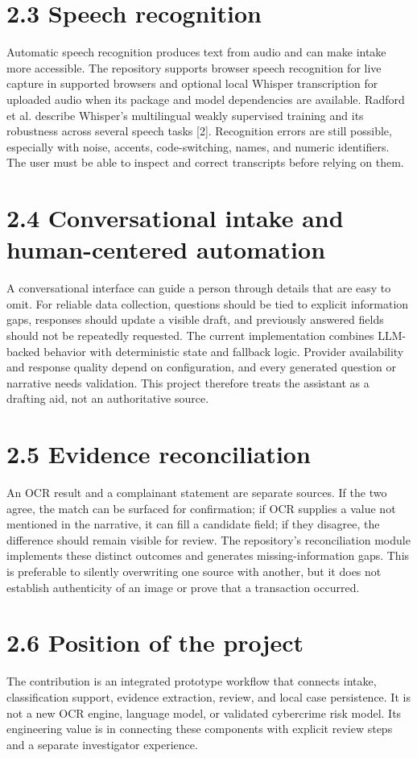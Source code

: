 \documentclass[12pt,a4paper,oneside]{report}
\begin{document}
\section{2.3 Speech recognition}
Automatic speech recognition produces text from audio and can make intake more accessible. The repository supports browser speech recognition for live capture in supported browsers and optional local Whisper transcription for uploaded audio when its package and model dependencies are available. Radford et al. describe Whisper's multilingual weakly supervised training and its robustness across several speech tasks [2]. Recognition errors are still possible, especially with noise, accents, code-switching, names, and numeric identifiers. The user must be able to inspect and correct transcripts before relying on them.

\section{2.4 Conversational intake and human-centered automation}
A conversational interface can guide a person through details that are easy to omit. For reliable data collection, questions should be tied to explicit information gaps, responses should update a visible draft, and previously answered fields should not be repeatedly requested. The current implementation combines LLM-backed behavior with deterministic state and fallback logic. Provider availability and response quality depend on configuration, and every generated question or narrative needs validation. This project therefore treats the assistant as a drafting aid, not an authoritative source.

\section{2.5 Evidence reconciliation}
An OCR result and a complainant statement are separate sources. If the two agree, the match can be surfaced for confirmation; if OCR supplies a value not mentioned in the narrative, it can fill a candidate field; if they disagree, the difference should remain visible for review. The repository's reconciliation module implements these distinct outcomes and generates missing-information gaps. This is preferable to silently overwriting one source with another, but it does not establish authenticity of an image or prove that a transaction occurred.

\section{2.6 Position of the project}
The contribution is an integrated prototype workflow that connects intake, classification support, evidence extraction, review, and local case persistence. It is not a new OCR engine, language model, or validated cybercrime risk model. Its engineering value is in connecting these components with explicit review steps and a separate investigator experience.
\end{document}
